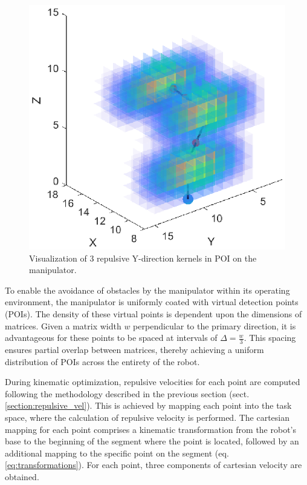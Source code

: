 \documentclass[letterpaper, 10 pt, conference]{ieeeconf}  %
\begin{document}
\begin{figure}
	\centering
	\includegraphics[width=1.0\linewidth]{manipulator-kernels-visualization-small.eps} %
	\caption{Visualization of 3 repulsive Y-direction kernels in POI on the manipulator.}
	\label{fig:kernels}
\end{figure}

To enable the avoidance of obstacles by the manipulator within its operating environment, the manipulator is uniformly coated with virtual detection points (POIs). The density of these virtual points is dependent upon the dimensions of matrices. Given a matrix width $w$ perpendicular to the primary direction, it is advantageous for these points to be spaced at intervals of $\Delta = \frac{w}{3}$. This spacing ensures partial overlap between matrices, thereby achieving a uniform distribution of POIs across the entirety of the robot.

During kinematic optimization, repulsive velocities for each point are computed following the methodology described in the previous section (sect. \ref{section:repulsive_vel}). This is achieved by mapping each point into the task space, where the calculation of repulsive velocity is performed. The cartesian mapping for each point comprises a kinematic transformation from the robot's base to the beginning of the segment where the point is located, followed by an additional mapping to the specific point on the segment (eq. \ref{eq:transformations}).  For each point, three components of cartesian velocity are obtained.
\end{document}
